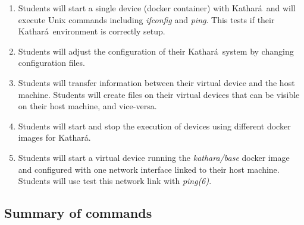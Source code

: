 \documentclass[12pt]{book}
\newcommand{\kathara}{Kathar\'a}
\begin{document}
\begin{enumerate}[label=Objective \arabic*]
  \item\label{vstart} Students will start a single device (docker container) with \kathara\ and will execute Unix commands including \emph{ifconfig} and \emph{ping}. This tests if their \kathara\ environment is correctly setup.
  \item\label{config} Students will adjust the configuration of their \kathara\ system by changing configuration files.
  \item\label{hosthome} Students will transfer information between their virtual device and the host machine. Students will create files on their virtual devices that can be visible on their host machine, and vice-versa.
  \item\label{image} Students will start and stop the execution of devices using different docker images for \kathara.
    \item\label{bridged} Students will start a virtual device running the \emph{kathara/base} docker image and configured with one network interface linked to their host machine. Students will use test this network link with \emph{ping(6)}. 
\end{enumerate}


\subsection{Summary of commands}
\end{document}
